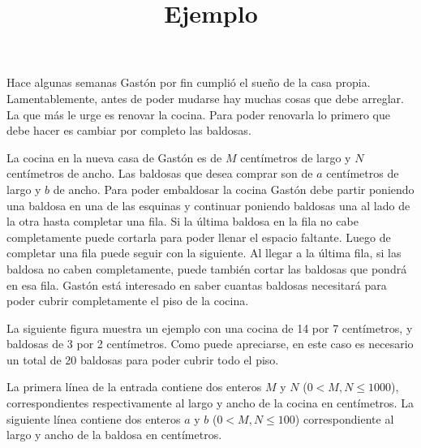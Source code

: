\documentclass{oci}
\title{Ejemplo}
\begin{document}
\begin{problemDescription}
  Hace algunas semanas Gastón por fin cumplió el sueño de la casa propia.
  Lamentablemente, antes de poder mudarse hay muchas cosas que debe arreglar.
  La que más le urge es renovar la cocina.
  Para poder renovarla lo primero que debe hacer es cambiar por completo las
  baldosas.

  La cocina en la nueva casa de Gastón es de $M$ centímetros de largo y $N$
  centímetros de ancho.
  Las baldosas que desea comprar son de $a$ centímetros de largo y $b$ de ancho.
  Para poder embaldosar la cocina Gastón debe partir poniendo una baldosa en una
  de las esquinas y continuar poniendo baldosas una al lado de la otra hasta
  completar una fila.
  Si la última baldosa en la fila no cabe completamente puede cortarla para
  poder llenar el espacio faltante.
  Luego de completar una fila puede seguir con la siguiente.
  Al llegar a la última fila, si las baldosa no caben completamente, puede
  también cortar las baldosas que pondrá en esa fila.
  Gastón está interesado en saber cuantas baldosas necesitará para poder cubrir
  completamente el piso de la cocina.

  La siguiente figura muestra un ejemplo con una cocina de 14 por 7 centímetros,
  y baldosas de 3 por 2 centímetros.
  Como puede apreciarse, en este caso es necesario un total de 20 baldosas para
  poder cubrir todo el piso.
  \begin{center}
  \end{center}
\end{problemDescription}

\begin{inputDescription}
  La primera línea de la entrada contiene dos enteros $M$ y $N$ ($0 < M, N \leq
  1000$), correspondientes respectivamente al largo y ancho de la cocina en
  centímetros.
  La siguiente línea contiene dos enteros $a$ y $b$ ($0 < M, N \leq 100$)
  correspondiente al largo y ancho de la baldosa en centímetros.
\end{inputDescription}
\end{document}
